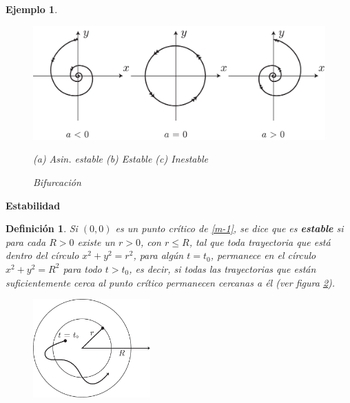 \documentclass[a5paper,doc,10pt,noapacite]{apa6}
\newtheorem{definicion}{Definición}
\newtheorem{ejem}{Ejemplo}
\newcommand{\neodefi}[1]{%
	\vspace{1\baselineskip}
	\textbf{\small#1} \newline
}
\begin{document}
{{\begin{ejem}
	\vspace{-1\baselineskip}
	\begin{figure}[H]
		\captionsetup{justification=centering, labelfont=footnotesize, font=footnotesize}
		\centering
		\includegraphics[scale=0.4]{Graficos/figura9}
	
		\footnotesize		
		\hspace{-2.5em}
		(a) Asin. estable	\qquad\quad
		(b) Estable		\qquad\quad
		(c) Inestable
		\caption{Bifurcación}
		\label{fig:M-9}
	\end{figure}
	
\end{ejem}


\neodefi{Estabilidad}

\begin{definicion}
				Si \((0,0)\) es un punto crítico de \eqref{m-1}, se dice que es \emph{\textbf{estable}} si para cada \(R>0\) existe un \(r>0\), con \(r\leq R\), tal que toda trayectoria que está dentro del círculo \(x^2+y^2=r^2\), para algún  \(t=t_0\), permanece en el círculo \(x^2+y^2=R^2\) para todo \(t>t_0\), es decir, si todas las trayectorias que están suficientemente cerca al punto crítico permanecen cercanas a él (ver figura \ref{fig:M-10}).

\vspace{-1\baselineskip}
	\begin{figure}[H]
		\captionsetup{justification=centering, labelfont=footnotesize, font=footnotesize}
		\centering
		\includegraphics[width=4.5cm]{Graficos/figura10}
	
		\caption{}
		\label{fig:M-10}
	\end{figure}
\end{definicion}

}}
\end{document}
